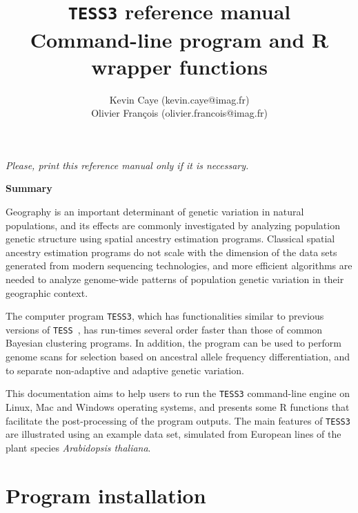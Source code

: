 \documentclass[10pt,a4paper]{article}
\title{{\tt TESS3} reference manual \\
Command-line program and R wrapper functions
}
\author{
        Kevin Caye (kevin.caye@imag.fr)\\
        Olivier Fran\c cois (olivier.francois@imag.fr)\\
}
\begin{document}
\maketitle
\begin{center}
{\it Please, print this reference manual only if it is necessary.}
\end{center}

\vspace{.5cm}

\begin{center} {\bf Summary}
\end{center}


\vspace{.5cm}

Geography is an important determinant of genetic variation in natural populations, and its effects are commonly investigated by analyzing population genetic structure using spatial ancestry estimation programs. Classical spatial ancestry estimation programs do not scale with the dimension of the data sets generated from modern sequencing technologies, and more efficient algorithms are needed to analyze genome-wide patterns of population genetic variation in their geographic context.

The computer program {\tt TESS3}, which has functionalities similar to previous versions of {\tt TESS}~\cite{durand2009spatial}, has run-times several order faster than those of common Bayesian clustering programs. In addition, the program can be used to perform genome scans for selection based on ancestral allele frequency differentiation, and to separate non-adaptive and adaptive genetic variation.

This documentation aims to help users to run the {\tt TESS3} command-line engine on Linux, Mac and Windows operating systems, and presents some R functions that facilitate the post-processing of the program outputs. The main features of {\tt TESS3} are illustrated using an example data set, simulated from European lines of the plant species {\it Arabidopsis thaliana}.

\vspace{.5cm}


\section{Program installation} 
\end{document}

